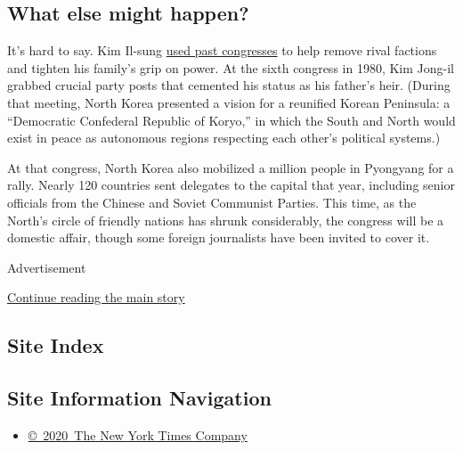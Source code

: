 \hypertarget{what-else-might-happen}{%
\subsection{What else might happen?}\label{what-else-might-happen}}

It's hard to say. Kim Il-sung
\href{https://www.nknews.org/2016/05/what-happens-at-a-north-korean-party-conference-or-congress/}{used
past congresses} to help remove rival factions and tighten his family's
grip on power. At the sixth congress in 1980, Kim Jong-il grabbed
crucial party posts that cemented his status as his father's heir.
(During that meeting, North Korea presented a vision for a reunified
Korean Peninsula: a ``Democratic Confederal Republic of Koryo,'' in
which the South and North would exist in peace as autonomous regions
respecting each other's political systems.)

At that congress, North Korea also mobilized a million people in
Pyongyang for a rally. Nearly 120 countries sent delegates to the
capital that year, including senior officials from the Chinese and
Soviet Communist Parties. This time, as the North's circle of friendly
nations has shrunk considerably, the congress will be a domestic affair,
though some foreign journalists have been invited to cover it.

Advertisement

\protect\hyperlink{after-bottom}{Continue reading the main story}

\hypertarget{site-index}{%
\subsection{Site Index}\label{site-index}}

\hypertarget{site-information-navigation}{%
\subsection{Site Information
Navigation}\label{site-information-navigation}}

\begin{itemize}
\tightlist
\item
  \href{https://help.nytimes3xbfgragh.onion/hc/en-us/articles/115014792127-Copyright-notice}{©~2020~The
  New York Times Company}
\end{itemize}

